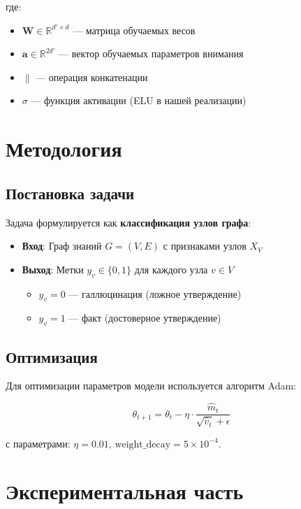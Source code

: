 \documentclass[12pt,a4paper]{article}
\begin{document}
где:
\begin{itemize}
    \item $\mathbf{W} \in \mathbb{R}^{d' \times d}$ — матрица обучаемых весов
    \item $\mathbf{a} \in \mathbb{R}^{2d'}$ — вектор обучаемых параметров внимания
    \item $\|$ — операция конкатенации
    \item $\sigma$ — функция активации (ELU в нашей реализации)
\end{itemize}

\section{Методология}

\subsection{Постановка задачи}
Задача формулируется как \textbf{классификация узлов графа}:
\begin{itemize}
    \item \textbf{Вход}: Граф знаний $G = (V, E)$ с признаками узлов $X_V$
    \item \textbf{Выход}: Метки $y_v \in \{0, 1\}$ для каждого узла $v \in V$
    \begin{itemize}
        \item $y_v = 0$ — галлюцинация (ложное утверждение)
        \item $y_v = 1$ — факт (достоверное утверждение)
    \end{itemize}
\end{itemize}

\subsection{Оптимизация}
Для оптимизации параметров модели используется алгоритм Adam:

\begin{equation}
\theta_{t+1} = \theta_t - \eta \cdot \frac{\hat{m}_t}{\sqrt{\hat{v}_t} + \epsilon}
\end{equation}

с параметрами: $\eta = 0.01$, $\text{weight\_decay} = 5 \times 10^{-4}$.

\section{Экспериментальная часть}
\end{document}
